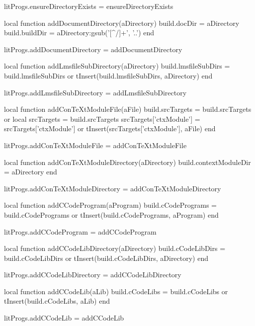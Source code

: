 litProgs.ensureDirectoryExists = ensureDirectoryExists

local function addDocumentDirectory(aDirectory)
  build.docDir   = aDirectory
  build.buildDir = aDirectory:gsub('[^/]+', '..')
end

litProgs.addDocumentDirectory = addDocumentDirectory

local function addLmsfileSubDirectory(aDirectory)
  build.lmsfileSubDirs = build.lmsfileSubDirs or { }
  tInsert(build.lmsfileSubDirs, aDirectory)
end

litProgs.addLmsfileSubDirectory = addLmsfileSubDirectory

local function addConTeXtModuleFile(aFile)
  build.srcTargets = build.srcTargets or { }
  local srcTargets = build.srcTargets
  srcTargets['ctxModule'] = srcTargets['ctxModule'] or { }
  tInsert(srcTargets['ctxModule'], aFile)
end

litProgs.addConTeXtModuleFile = addConTeXtModuleFile

local function addConTeXtModuleDirectory(aDirectory)
  build.contextModuleDir = aDirectory
end

litProgs.addConTeXtModuleDirectory = addConTeXtModuleDirectory

local function addCCodeProgram(aProgram)
  build.cCodePrograms = build.cCodePrograms or { }
  tInsert(build.cCodePrograms, aProgram)
end

litProgs.addCCodeProgram = addCCodeProgram

local function addCCodeLibDirectory(aDirectory)
  build.cCodeLibDirs = build.cCodeLibDirs or { }
  tInsert(build.cCodeLibDirs, aDirectory)
end

litProgs.addCCodeLibDirectory = addCCodeLibDirectory

local function addCCodeLib(aLib)
  build.cCodeLibs = build.cCodeLibs or { }
  tInsert(build.cCodeLibs, aLib)
end

litProgs.addCCodeLib = addCCodeLib

